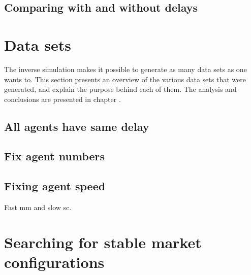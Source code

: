 \subsection{Comparing with and without delays}

\section{Data sets} %
The inverse simulation makes it possible to generate as many data sets as one wants to. This section presents an overview of the various data sets that were generated, and explain the purpose behind each of them. The analysis and conclusions are presented in chapter \label{chapter:model}.

\label{sec:data_sets}

\subsection{All agents have same delay} %
\label{sub:all_agents_have_same_delay}


\subsection{Fix agent numbers} %
\label{sub:fixing_agent_numbers}


\subsection{Fixing agent speed} %
\label{sub:fixing_agent_speed}
Fast mm and slow sc.




\section{Searching for stable market configurations}

